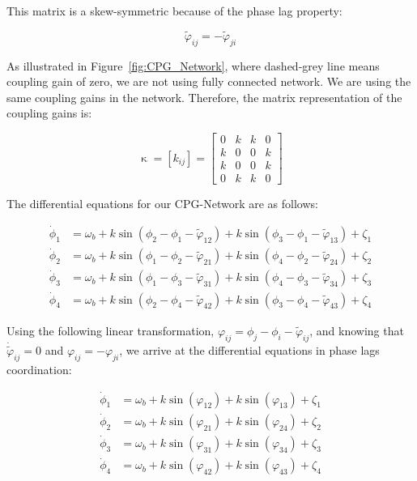 \documentclass{article}
\begin{document}
This matrix is a skew-symmetric because of the phase lag property:

\begin{equation}
	\tilde{\varphi}_{ij} = - \tilde{\varphi}_{ji}
\end{equation}

As illustrated in Figure~\ref{fig:CPG_Network}, where dashed-grey line means coupling gain of zero, we are not using fully connected network.  We are using the same coupling gains in the network. Therefore, the matrix representation of the coupling gains is:
 
\begin{equation}
	\upkappa = [k_{ij}]=\left[ \begin{array}{rrrr}
	0 & k & k & 0  \\
	k & 0 & 0 & k  \\
	k & 0 & 0 & k  \\
	0 & k & k & 0 
	\end{array} \right]
\end{equation}

The differential equations for our CPG-Network are as follows:

\begin{align}\label{eq:cpg_net}
	\dot\phi_1&=\omega_{b} + k\sin \left(\phi_2-\phi_1-\tilde{\varphi}_{12}\right)+k\sin\left(\phi_3-\phi_1-\tilde{\varphi}_{13}\right)+ \zeta_1\\
 	\dot\phi_2&=\omega_{b} + k\sin \left(\phi_1-\phi_2-\tilde{\varphi}_{21}\right)+k\sin\left(\phi_4-\phi_2-\tilde{\varphi}_{24}\right)+ \zeta_2\\
 	\dot\phi_3&=\omega_{b} + k\sin \left(\phi_1-\phi_3-\tilde{\varphi}_{31}\right)+k\sin\left(\phi_4-\phi_3-\tilde{\varphi}_{34}\right)+ \zeta_3\\
	\dot\phi_4&=\omega_{b} + k\sin \left(\phi_2-\phi_4-\tilde{\varphi}_{42}\right)+k\sin\left(\phi_3-\phi_4-\tilde{\varphi}_{43}\right)+ \zeta_4
\end{align}

Using the following linear transformation, $\varphi_{ij} = \phi_j - \phi_i - \tilde{\varphi}_{ij}$, and knowing that $\dot{\tilde{\varphi}}_{ij} = 0$ and $\varphi_{ij} = - \varphi_{ji}$, we arrive at the differential equations in phase lags coordination: 

\begin{align}\label{eq:cpg_net2}
	\dot\phi_1&=\omega_{b} + k\sin \left(\varphi_{12}\right)+k\sin\left(\varphi_{13}\right)+ \zeta_1\\
 	\dot\phi_2&=\omega_{b} + k\sin \left(\varphi_{21}\right)+k\sin\left(\varphi_{24}\right)+ \zeta_2\\
 	\dot\phi_3&=\omega_{b} + k\sin \left(\varphi_{31}\right)+k\sin\left(\varphi_{34}\right)+ \zeta_3\\
	\dot\phi_4&=\omega_{b} + k\sin \left(\varphi_{42}\right)+k\sin\left(\varphi_{43}\right)+ \zeta_4
\end{align}
\end{document}
